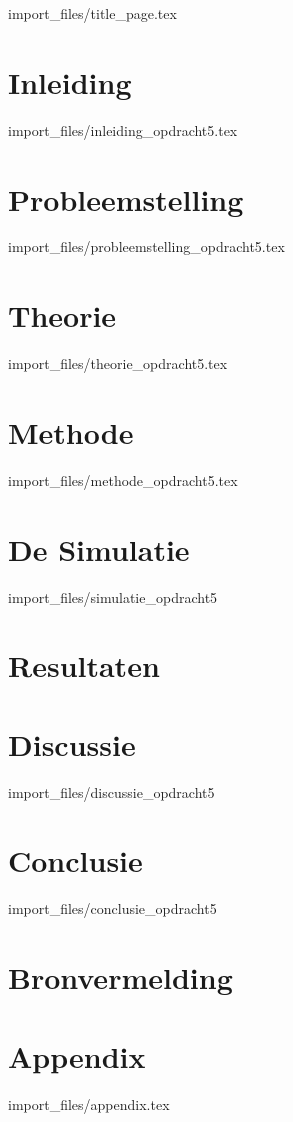 \documentclass{article}
\begin{document}
{import_files/title_page.tex}

\tableofcontents
\clearpage

\section{Inleiding}

{import_files/inleiding_opdracht5.tex}

\section{Probleemstelling}

{import_files/probleemstelling_opdracht5.tex}

\section{Theorie}

{import_files/theorie_opdracht5.tex}

\section{Methode}

{import_files/methode_opdracht5.tex}

\section{De Simulatie}
 
{import_files/simulatie_opdracht5}

\section{Resultaten}


\section{Discussie}

{import_files/discussie_opdracht5}

\section{Conclusie}

{import_files/conclusie_opdracht5}

\section{Bronvermelding}

\section{Appendix}

{import_files/appendix.tex}
\end{document}
